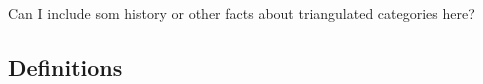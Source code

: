 \documentclass[../thesis.tex]{subfiles}
\begin{document}
    Can I include som history or other facts about triangulated categories here?

    \subsection{Definitions}
        
\end{document}
